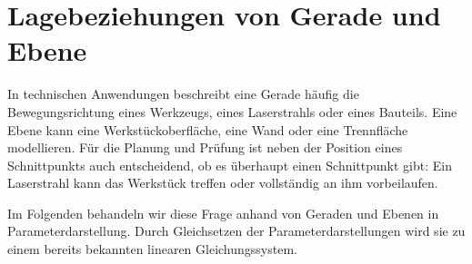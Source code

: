 \section{Lagebeziehungen von Gerade und Ebene}
\label{sec:analytic_geometry_line_plane_relationships}

In technischen Anwendungen beschreibt eine Gerade häufig die Bewegungsrichtung
eines Werkzeugs, eines Laserstrahls oder eines Bauteils. Eine Ebene kann eine
Werkstückoberfläche, eine Wand oder eine Trennfläche modellieren. Für die
Planung und Prüfung ist neben der Position eines Schnittpunkts auch
entscheidend, ob es überhaupt einen Schnittpunkt gibt: Ein Laserstrahl kann
das Werkstück treffen oder vollständig an ihm vorbeilaufen.

Im Folgenden behandeln wir diese Frage anhand von Geraden und Ebenen in
Parameterdarstellung. Durch Gleichsetzen der Parameterdarstellungen wird sie
zu einem bereits bekannten linearen Gleichungssystem.


